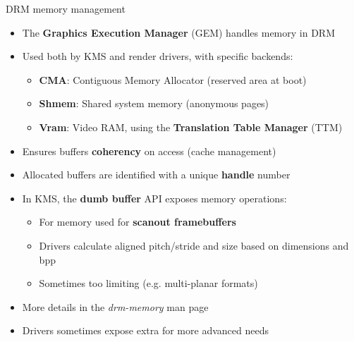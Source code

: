 \begin{frame}[fragile]{DRM memory management}
  \begin{itemize}
  \item The \textbf{Graphics Execution Manager} (GEM) handles memory in DRM
  \item Used both by KMS and render drivers, with specific backends:
    \begin{itemize}
    \item \textbf{CMA}: Contiguous Memory Allocator (reserved area at boot)
    \item \textbf{Shmem}: Shared system memory (anonymous pages)
    \item \textbf{Vram}: Video RAM, using the \textbf{Translation Table Manager} (TTM)
    \end{itemize}
  \item Ensures buffers \textbf{coherency} on access (cache management)
  \item Allocated buffers are identified with a unique \textbf{handle} number
  \item In KMS, the \textbf{dumb buffer} API exposes memory operations:
    \begin{itemize}
    \item For memory used for \textbf{scanout framebuffers}
    \item Drivers calculate aligned pitch/stride and size based on dimensions and bpp
    \item Sometimes too limiting (e.g. multi-planar formats)
    \end{itemize}
  \item More details in the \textit{drm-memory} man page
  \item Drivers sometimes expose extra  for more advanced needs
  \end{itemize}
\end{frame}

